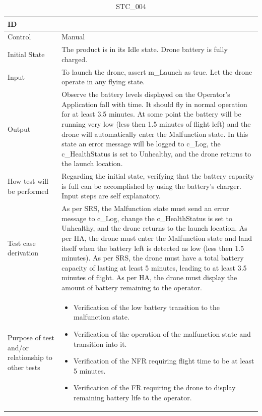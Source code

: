 \documentclass[12pt, titlepage]{article}
\begin{document}
\begin{table}[!h]
\begin{center}
\caption {STC\_004}
\label{tab:STC_004}
\begin{tabular}{ | m{3.2cm} | m{12.2cm} | } 
\hline
ID & \nameref{tab:STC_004} \\ 
\hline
Control & Manual \\ 
\hline
Initial State & The product is in its Idle state. Drone battery is fully charged. \\ 
\hline
Input & To launch the drone, assert m\_Launch as true. Let the drone operate in any flying state. \\ 
\hline
Output & Observe the battery levels displayed on the Operator’s Application fall with time. It should fly in normal operation for at least 3.5 minutes.
At some point the battery will be running very low (less then 1.5 minutes of flight left) and the drone will automatically enter the Malfunction state. In this state an error message will be logged to c\_Log, the c\_HealthStatus is set to Unhealthy, and the drone returns to the launch location. \\ 
\hline
How test will be performed & Regarding the initial state, verifying that the battery capacity is full can be accomplished by using the battery's charger. Input steps are self explanatory. \\ 
\hline
Test case derivation & As per SRS, the Malfunction state must send an error message to c\_Log, change the c\_HealthStatus is set to Unhealthy, and the drone returns to the launch location.
As per HA, the drone must enter the Malfunction state and land itself when the battery left is detected as low (less then 1.5 minutes). As per SRS, the drone must have a total battery capacity of lasting at least 5 minutes, leading to at least 3.5 minutes of flight.
As per HA, the drone must display the amount of battery remaining to the operator. 
 \\ 
\hline
Purpose of test and/or relationship to other tests & 
\begin{itemize}
    \item Verification of the low battery transition to the malfunction state. 
    \item Verification of the operation of the malfunction state and transition into it.
    \item Verification of the NFR requiring flight time to be at least 5 minutes. 
    \item Verification of the FR requiring the drone to display remaining battery life to the operator. 
\end{itemize}
\\ 
\hline
\end{tabular}
\end{center}
\end{table}
\end{document}
